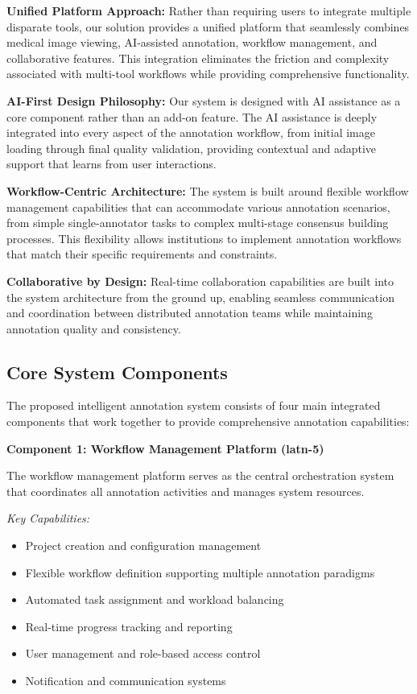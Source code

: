 \textbf{Unified Platform Approach:} Rather than requiring users to integrate multiple disparate tools, our solution provides a unified platform that seamlessly combines medical image viewing, AI-assisted annotation, workflow management, and collaborative features. This integration eliminates the friction and complexity associated with multi-tool workflows while providing comprehensive functionality.

\textbf{AI-First Design Philosophy:} Our system is designed with AI assistance as a core component rather than an add-on feature. The AI assistance is deeply integrated into every aspect of the annotation workflow, from initial image loading through final quality validation, providing contextual and adaptive support that learns from user interactions.

\textbf{Workflow-Centric Architecture:} The system is built around flexible workflow management capabilities that can accommodate various annotation scenarios, from simple single-annotator tasks to complex multi-stage consensus building processes. This flexibility allows institutions to implement annotation workflows that match their specific requirements and constraints.

\textbf{Collaborative by Design:} Real-time collaboration capabilities are built into the system architecture from the ground up, enabling seamless communication and coordination between distributed annotation teams while maintaining annotation quality and consistency.

\subsection{Core System Components}

The proposed intelligent annotation system consists of four main integrated components that work together to provide comprehensive annotation capabilities:

\textbf{Component 1: Workflow Management Platform (latn-5)}

The workflow management platform serves as the central orchestration system that coordinates all annotation activities and manages system resources.

\textit{Key Capabilities:}
\begin{itemize}
    \item Project creation and configuration management
    \item Flexible workflow definition supporting multiple annotation paradigms
    \item Automated task assignment and workload balancing
    \item Real-time progress tracking and reporting
    \item User management and role-based access control
    \item Notification and communication systems
\end{itemize}

